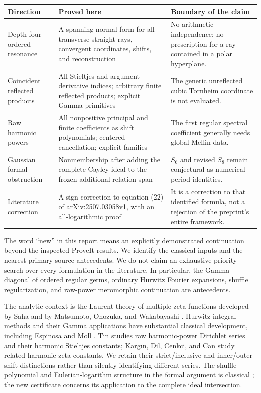 \begin{longtable}{@{}p{}p{}p{}@{}}
\toprule
Direction & Proved here & Boundary of the claim\\
\midrule
\endhead
Depth-four ordered resonance & A spanning normal form for all transverse
straight rays, convergent coordinates, shifts, and reconstruction &
No arithmetic independence; no prescription for a ray contained in a
polar hyperplane.\\[5pt]
Coincident reflected products & All Stieltjes and argument derivative
indices; arbitrary finite reflected products; explicit Gamma primitives &
The generic unreflected cubic Tornheim coordinate is not evaluated.\\[5pt]
Raw harmonic powers & All nonpositive principal and finite coefficients
as shift polynomials; centered cancellation; explicit families &
The first regular spectral coefficient generally needs global Mellin
data.\\[5pt]
Gaussian formal obstruction & Nonmembership after adding the complete
Cayley ideal to the frozen additional relation span &
$S_6$ and revised $S_8$ remain conjectural as numerical period identities.\\[5pt]
Literature correction & A sign correction to equation (22) of
arXiv:2507.03058v1, with an all-logarithmic proof &
It is a correction to that identified formula, not a rejection of the
preprint's entire framework.\\
\bottomrule
\end{longtable}

The word ``new'' in this report means an explicitly demonstrated
continuation beyond the inspected ProveIt results. We identify the
classical inputs and the nearest primary-source antecedents. We do not
claim an exhaustive priority search over every formulation in the
literature. In particular, the Gamma diagonal of ordered regular germs,
ordinary Hurwitz Fourier expansions, shuffle regularization, and
raw-power meromorphic continuation are antecedents.

The analytic context is the Laurent theory of multiple zeta functions
developed by Saha \cite{Saha} and by Matsumoto, Onozuka, and Wakabayashi
\cite{MOW}. Hurwitz integral methods and their Gamma applications have
substantial classical development, including Espinosa and Moll
\cite{EspinosaMoll1,EspinosaMoll2}. Tin \cite{hp:Tin2025} studies raw
harmonic-power Dirichlet series and their harmonic Stieltjes constants;
Karg\i n, Dil, Cenkci, and Can \cite{Kargin} study related harmonic zeta
constants. We retain their strict/inclusive and inner/outer shift
distinctions rather than silently identifying different series.
The shuffle-polynomial and Eulerian-logarithm structure in the formal
argument is classical \cite{gf:Radford,gf:Patras}; the new certificate
concerns its application to the complete ideal intersection.

